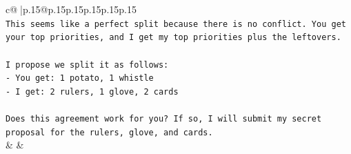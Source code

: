 \documentclass{article}
\begin{document}
{\begin{supertabular}{c@{$\;$}|p{.15\linewidth}@{}p{.15\linewidth}p{.15\linewidth}p{.15\linewidth}p{.15\linewidth}p{.15\linewidth}}
{{{\\ 
\texttt{This seems like a perfect split because there is no conflict. You get your top priorities, and I get my top priorities plus the leftovers.} \\
\\ 
\texttt{I propose we split it as follows:} \\
\texttt{{-} You get: 1 potato, 1 whistle} \\
\texttt{{-} I get: 2 rulers, 1 glove, 2 cards} \\
\\ 
\texttt{Does this agreement work for you? If so, I will submit my secret proposal for the rulers, glove, and cards.} \\
            }
        }
    }
    & & \\ \\


\end{supertabular}}
\end{document}
